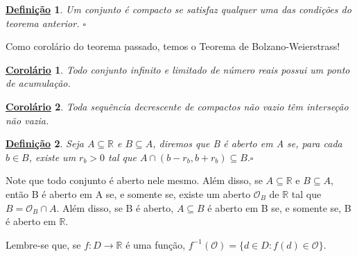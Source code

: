 \documentclass{article}
\newtheorem*{def*}{\underline{Defini\c c\~ao}}
\newtheorem*{crl*}{\underline{Corol\'ario}}
\begin{document}
\begin{def*}
  Um conjunto é compacto se satisfaz qualquer uma das condições do teorema anterior. $\square$
\end{def*}
  Como corolário do teorema passado, temos o Teorema de Bolzano-Weierstrass!
\begin{crl*}
  Todo conjunto infinito e limitado de número reais possui um ponto de acumulação. 
\end{crl*}
\begin{crl*}
  Toda sequência decrescente de compactos não vazio têm interseção não vazia.
\end{crl*}
\begin{def*}
  Seja $A\subseteq{\mathbb{R}}$ e $B\subseteq{A}$, diremos que B é aberto em A se, para cada $b\in B$, existe um $r_{b}>0$ tal 
  que $A\cap (b-r_{b}, b + r_{b})\subseteq{B}.\square$
\end{def*}
  Note que todo conjunto é aberto nele mesmo. Além disso, se $A\subseteq{\mathbb{R}}$ e $B\subseteq{A}$, então B é aberto em A
  se, e somente se, existe um aberto $\mathcal{O}_{B}$ de $\mathbb{R}$ tal que $B=\mathcal{O}_{B}\cap A.$ Além disso,
  se B é aberto, $A\subseteq{B}$ é aberto em B se, e somente se, B é aberto em $\mathbb{R}.$

  Lembre-se que, se $f:D\rightarrow \mathbb{R}$ é uma função, $f^{-1}(\mathcal{O})=\{d\in D: f(d)\in \mathcal{O}\}.$
\end{document}
